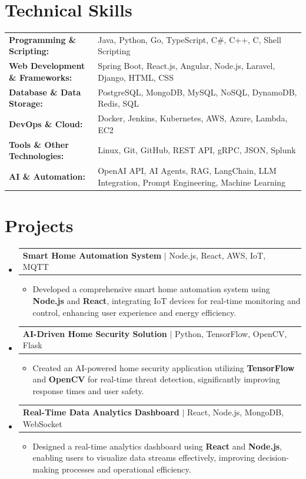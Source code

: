\documentclass[letterpaper,10pt]{article}
\makeatletter
\newcommand{\resumeItem}[1]{
  \item{\fontsize{8pt}{9pt}\selectfont
    #1 \vspace{-3pt}
  }
}
\newcommand{\resumeProjectHeading}[2]{
    \item
    \begin{tabular*}{1.001\textwidth}{l@{\extracolsep{\fill}}r}
      \fontsize{8.5pt}{10pt}#1 & \textbf{\fontsize{8.5pt}{10pt} #2}\\
    \end{tabular*}\vspace{-7pt}
}
\newcommand{\resumeSubHeadingListStart}{\begin{itemize}[leftmargin=0pt, label={}]}
\newcommand{\resumeSubHeadingListEnd}{\end{itemize}}
\newcommand{\resumeItemListStart}{\begin{itemize}[leftmargin=*]}
\newcommand{\resumeItemListEnd}{\end{itemize}\vspace{-5pt}}
\makeatother
\begin{document}
\section{Technical Skills}
        \vspace{-14pt}
        \begin{table}[h]
            \fontsize{8pt}{9pt}\selectfont
            \begin{tabular}{p{0.3\linewidth} p{0.7\linewidth}}
                \textbf{Programming \& Scripting:} & Java, Python, Go, TypeScript, C\#, C++, C, Shell Scripting \\
                \textbf{Web Development \& Frameworks:} & Spring Boot, React.js, Angular, Node.js, Laravel, Django, HTML, CSS \\
                \textbf{Database \& Data Storage:} & PostgreSQL, MongoDB, MySQL, NoSQL, DynamoDB, Redis, SQL \\
                \textbf{DevOps \& Cloud:} & Docker, Jenkins, Kubernetes, AWS, Azure, Lambda, EC2 \\
                \textbf{Tools \& Other Technologies:} & Linux, Git, GitHub, REST API, gRPC, JSON, Splunk \\
                \textbf{AI \& Automation:} & OpenAI API, AI Agents, RAG, LangChain, LLM Integration, Prompt Engineering, Machine Learning \\
            \end{tabular}
        \end{table}
 \vspace{-18pt}

\section{Projects}
    \vspace{-5pt}
    \resumeSubHeadingListStart
          \resumeProjectHeading
            {\textbf{Smart Home Automation System} $|$ Node.js, React, AWS, IoT, MQTT}{}
            \resumeItemListStart
                \resumeItem{Developed a comprehensive smart home automation system using \textbf{Node.js} and \textbf{React}, integrating IoT devices for real-time monitoring and control, enhancing user experience and energy efficiency.}
            \resumeItemListEnd
        \vspace{-12pt}
    
        \resumeProjectHeading
            {\textbf{AI-Driven Home Security Solution} $|$ Python, TensorFlow, OpenCV, Flask}{}
        \resumeItemListStart
                \resumeItem{Created an AI-powered home security application utilizing \textbf{TensorFlow} and \textbf{OpenCV} for real-time threat detection, significantly improving response times and user safety.}
        \resumeItemListEnd
      \vspace{-12pt}
      \resumeProjectHeading
        {\textbf{Real-Time Data Analytics Dashboard} $|$ React, Node.js, MongoDB, WebSocket}{}
    \resumeItemListStart
            \resumeItem{Designed a real-time analytics dashboard using \textbf{React} and \textbf{Node.js}, enabling users to visualize data streams effectively, improving decision-making processes and operational efficiency.}
    \resumeItemListEnd
    \resumeSubHeadingListEnd
\end{document}
